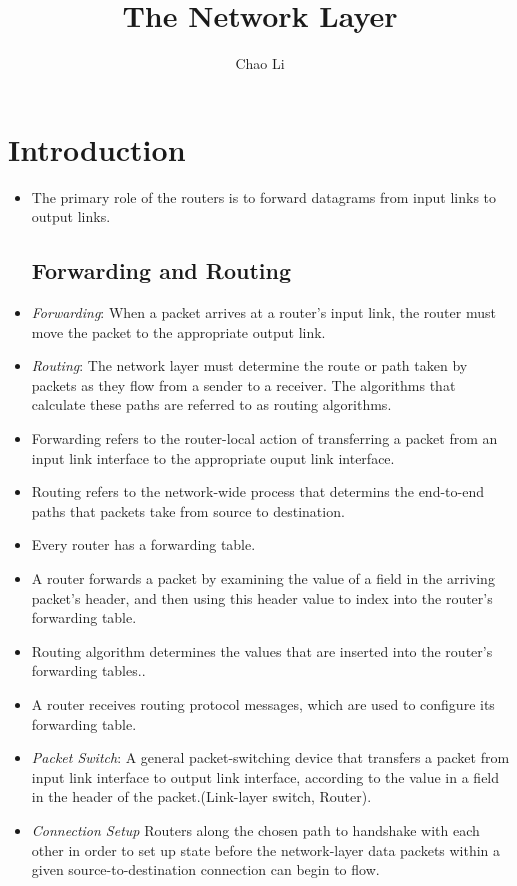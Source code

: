 \documentclass{article}
\title{The Network Layer}
\author{Chao Li}
\begin{document}
\maketitle
\section{Introduction}
\begin{itemize}
\item The primary role of the routers is to forward datagrams from
  input links to output links.
\subsection{Forwarding and Routing}
\item \emph{Forwarding}: When a packet arrives at a router's input
  link, the router must move the packet to the appropriate output
  link.
\item \emph{Routing}: The network layer must determine the route or
  path taken by packets as they flow from a sender to a receiver. The
  algorithms that calculate these paths are referred to as routing
  algorithms.
\item Forwarding refers to the router-local action of transferring a
  packet from an input link interface to the appropriate ouput link
  interface.
\item Routing refers to the network-wide process that determins the
  end-to-end paths that packets take from source to destination.
\item Every router has a forwarding table.
\item A router forwards a packet by examining the value of a field in
  the arriving packet's header, and then using this header value to
  index into the router's forwarding table.
\item Routing algorithm determines the values that are inserted into
  the router's forwarding tables..
\item A router receives routing protocol messages, which are used to
  configure its forwarding table.
\item \emph{Packet Switch}: A general packet-switching device that
  transfers a packet from input link interface to output link
  interface, according to the value in a field in the header of the
  packet.(Link-layer switch, Router).
\item \emph{Connection Setup} Routers along the chosen path to
  handshake with each other in order to set up state before the
  network-layer data packets within a given source-to-destination
  connection can begin to flow.

\end{itemize}
\end{document}
